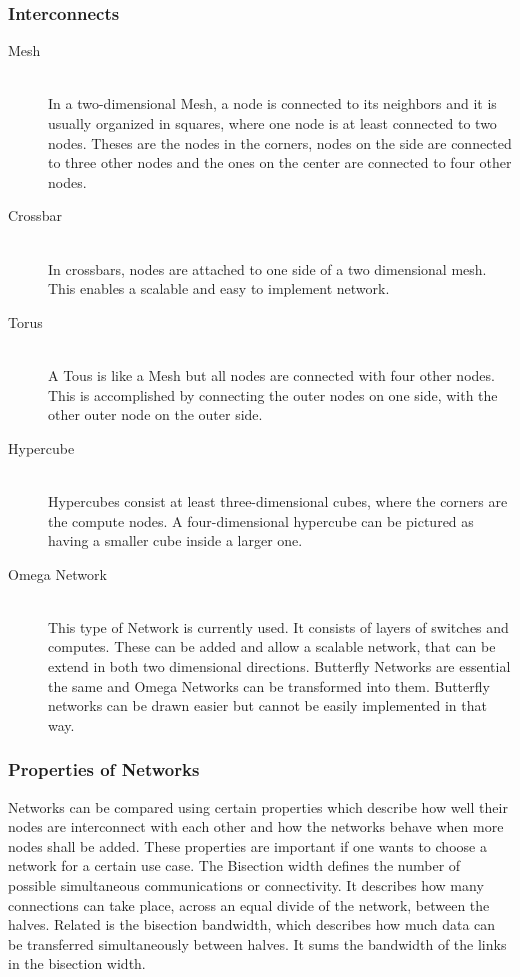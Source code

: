 \documentclass{article}
\begin{document}
\subsubsection{Interconnects} %
\label{ssub:interconnects}
	\begin{description}
			\item[Mesh] \hfill \\
			In a two-dimensional Mesh, a node is connected to its neighbors
			and it is usually organized in squares,
			where one node is at least connected to two nodes.
			Theses are the nodes in the corners,
			nodes on the side are connected to three other nodes
			and the ones on the center are connected to four other nodes.
		\item[Crossbar] \hfill \\
			In crossbars, nodes are attached to one side of a two dimensional mesh.
			This enables a scalable and easy to implement network.
		\item[Torus] \hfill \\
			A Tous is like a Mesh but all nodes are connected with four other nodes.
			This is accomplished by connecting the outer nodes on one side,
			with the other outer node on the outer side.
		\item[Hypercube] \hfill \\
			Hypercubes consist at least three-dimensional cubes,
			where the corners are the compute nodes.
			A four-dimensional hypercube can be pictured as having a smaller cube inside a larger one.
		\item[Omega Network] \hfill \\
			This type of Network is currently used.
			It consists of layers of switches and computes.
			These can be added and allow a scalable network,
			that can be extend in both two dimensional directions.
			Butterfly Networks are essential the same
			and Omega Networks can be transformed into them.
			Butterfly networks can be drawn easier but cannot be easily implemented in that way.
	\end{description}

\subsubsection{Properties of Networks} %
\label{ssub:properties_of_networks}
	Networks can be compared using certain properties
	which describe how well their nodes are interconnect with each other 
	and how the networks behave when more nodes shall be added.
	These properties are important if one wants to choose a network for a certain use case.
	The Bisection width defines the number of possible simultaneous communications or connectivity.
	It describes how many connections can take place,
	across an equal divide of the network, between the halves.
	Related is the bisection bandwidth,
	which describes how much data can be transferred simultaneously between halves.
	It sums the bandwidth of the links in the bisection width.
\end{document}
